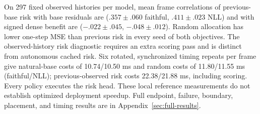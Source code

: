 On 297 fixed observed histories per model, mean frame correlations of
previous-base risk with base residuals are ($.357\pm.060$ faithful, $.411\pm.023$ NLL) and with signed dense benefit are ($-.022\pm.045$, $-.048\pm.012$). Random allocation
has lower one-step MSE than previous risk in every seed of both objectives.
The observed-history risk diagnostic requires an extra scoring pass and is
distinct from autonomous cached risk. Six rotated, synchronized timing repeats
per frame give natural-base costs of 10.74/10.50 ms and random costs of
11.80/11.55 ms (faithful/NLL); previous-observed risk costs 22.38/21.88 ms,
including scoring. Every policy executes the risk head. These local reference
measurements do not establish optimized deployment speedup. Full endpoint,
failure, boundary, placement, and timing results are in
Appendix~\ref{sec:full-results}.
